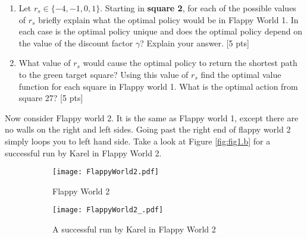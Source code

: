\documentclass[11pt]{article}
\begin{document}
\begin{enumerate}[label=(\alph*)]
\item  Let $r_s \in \{-4,-1,0,1\}$. Starting in \textbf{square 2}, for each of the possible values of $r_s$ briefly explain what the optimal policy would be in Flappy World 1. In each case is the optimal policy unique and does the optimal policy depend on the value of the discount factor $\gamma$? Explain your answer.   [5 pts]


\item What value of $r_s$ would cause the optimal policy to return the shortest path to the green target square? Using this value of $r_s$ find the optimal value function for each square in Flappy world 1. What is the optimal action from square 27?  [5 pts]


\end{enumerate}

\noindent Now consider Flappy world 2. It is the same as Flappy world 1, except there are no walls on the right and left sides. Going past the right end of flappy world 2 simply loops you to left hand side. Take a look at Figure \ref{fig:fig1.b} for a successful run by Karel in Flappy World 2.  

\begin{figure}[ht]
\begin{subfigure}{.5\textwidth}
  \centering
  \texttt{[image: FlappyWorld2.pdf]}  
  \caption{Flappy World 2}
  \label{fig:fig2.a}
\end{subfigure}
\begin{subfigure}{.5\textwidth}
  \centering
  \texttt{[image: FlappyWorld2\_.pdf]}  
  \caption{A successful run by Karel in Flappy World 2}
  \label{fig:fig2.b}
\end{subfigure}
\caption{}
\label{fig:fig2}
\end{figure}
\end{document}
